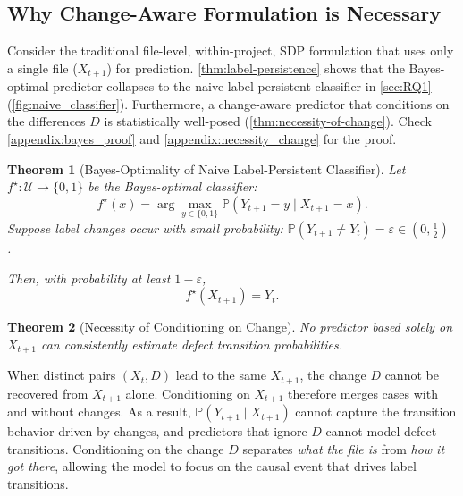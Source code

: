 \documentclass[authoryear,final,5p,times,twocolumn]{elsarticle}
\newtheorem{theorem}{Theorem}
\theoremstyle{plain}
\begin{document}
\subsection{Why Change-Aware Formulation is Necessary}
\label{sec:justification_change_aware}

Consider the traditional file-level, within-project, SDP formulation that uses only a single file ($X_{t+1}$) for prediction. 
\autoref{thm:label-persistence} shows that the Bayes-optimal predictor collapses to the naive label-persistent classifier in \autoref{sec:RQ1} (\autoref{fig:naive_classifier}). Furthermore, a change-aware predictor that conditions on the differences $D$ is statistically well-posed (\autoref{thm:necessity-of-change}). Check \ref{appendix:bayes_proof} and \ref{appendix:necessity_change} for the proof.
\begin{theorem}[Bayes-Optimality of Naive Label-Persistent Classifier]
\label{thm:label-persistence}
Let $f^\star:\mathcal U \to \{0,1\}$ be the Bayes-optimal classifier:
\[
f^\star(x) = \arg\max_{y \in \{0,1\}} \mathbb P(Y_{t+1}=y \mid X_{t+1}=x).
\]
Suppose label changes occur with small probability: $\mathbb P(Y_{t+1} \neq Y_t) = \varepsilon \in (0, \tfrac12)$ .

Then, with probability at least $1-\varepsilon$,
\[
f^\star(X_{t+1}) = Y_t.
\]
\end{theorem}
\begin{theorem}[Necessity of Conditioning on Change]
\label{thm:necessity-of-change}
No predictor based solely on $X_{t+1}$ can consistently estimate defect
transition probabilities.
\end{theorem}
When distinct pairs $(X_t, D)$ lead to the same $X_{t+1}$, the change $D$ cannot be recovered from $X_{t+1}$ alone. Conditioning on $X_{t+1}$ therefore merges cases with and without changes. As a result, $\mathbb{P}(Y_{t+1} \mid X_{t+1})$ cannot capture the transition behavior driven by changes, and predictors that ignore $D$ cannot model defect transitions. Conditioning on the change $D$ separates \emph{what the file is} from \emph{how it got there}, allowing the model to focus on the causal event that drives label transitions.
\end{document}
